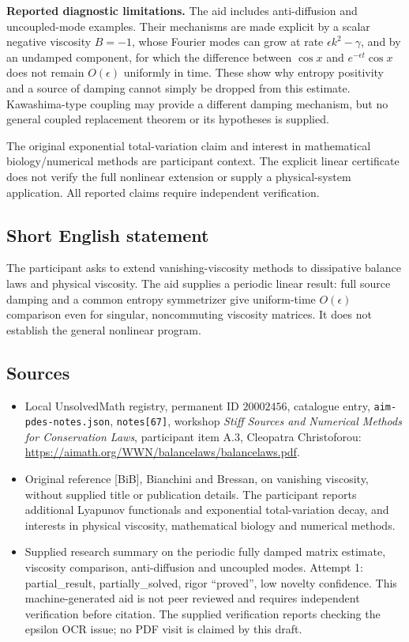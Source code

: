 \documentclass[11pt]{article}
\begin{document}
\textbf{Reported diagnostic limitations.} The aid includes anti-diffusion and uncoupled-mode examples. Their mechanisms are made explicit by a scalar negative viscosity \(B=-1\), whose Fourier modes can grow at rate \(\epsilon k^2-\gamma\), and by an undamped component, for which the difference between \(\cos x\) and \(e^{-\epsilon t}\cos x\) does not remain \(O(\epsilon)\) uniformly in time. These show why entropy positivity and a source of damping cannot simply be dropped from this estimate. Kawashima-type coupling may provide a different damping mechanism, but no general coupled replacement theorem or its hypotheses is supplied.

The original exponential total-variation claim and interest in mathematical biology/numerical methods are participant context. The explicit linear certificate does not verify the full nonlinear extension or supply a physical-system application. All reported claims require independent verification.
\subsection{Short English statement}
The participant asks to extend vanishing-viscosity methods to dissipative balance laws and physical viscosity. The aid supplies a periodic linear result: full source damping and a common entropy symmetrizer give uniform-time \(O(\epsilon)\) comparison even for singular, noncommuting viscosity matrices. It does not establish the general nonlinear program.
\subsection{Sources}
\begin{itemize}
\item Local UnsolvedMath registry, permanent ID \(20002456\), catalogue entry, \texttt{aim-pdes-notes.json}, \texttt{notes[67]}, workshop \emph{Stiff Sources and Numerical Methods for Conservation Laws}, participant item A.3, Cleopatra Christoforou: \url{https://aimath.org/WWN/balancelaws/balancelaws.pdf}.
\item Original reference [BiB], Bianchini and Bressan, on vanishing viscosity, without supplied title or publication details. The participant reports additional Lyapunov functionals and exponential total-variation decay, and interests in physical viscosity, mathematical biology and numerical methods.
\item Supplied research summary on the periodic fully damped matrix estimate, viscosity comparison, anti-diffusion and uncoupled modes. Attempt 1: partial\_result, partially\_solved, rigor ``proved'', low novelty confidence. This machine-generated aid is not peer reviewed and requires independent verification before citation. The supplied verification reports checking the epsilon OCR issue; no PDF visit is claimed by this draft.
\end{itemize}
\end{document}
